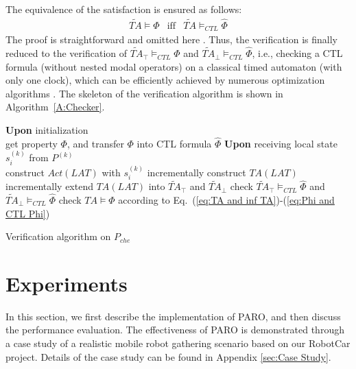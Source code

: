 \documentclass[10pt,conference,compsocconf,letterpaper]{IEEEtran}
\begin{document}
The equivalence of the satisfaction is ensured as follows:
\begin{eqnarray}\label{eq:Phi and CTL Phi}
\widetilde{TA} \models \Phi & \textrm{iff} & \widetilde{TA} \models_{CTL} \hat{\Phi}
\end{eqnarray}
The proof is straightforward and omitted here \cite{Baier08}. Thus, the verification is finally reduced to the verification of $\widetilde{TA}_\top\models_{CTL} \hat\Phi$ and $\widetilde{TA}_\bot\models_{CTL} \hat\Phi$, i.e., checking a CTL formula (without nested modal operators) on a classical timed automaton (with only one clock), which can be efficiently achieved by numerous optimization algorithms \cite{Baier08, Dill89, Laroussinie04, Wang04}. The skeleton of the verification algorithm is shown in Algorithm~\ref{A:Checker}.
\begin{algorithm}[tbp]
\SetAlgoVlined
\textbf{Upon} initialization\\
\hspace{0.4cm}get property $\Phi$, and transfer $\Phi$ into CTL formula $\hat{\Phi}$\;
\textbf{Upon} receiving local state $s^{(k)}_i$ from $P^{(k)}$\\
\hspace{0.4cm}construct $Act(LAT)$ with $s^{(k)}_i$ incrementally\;
\hspace{0.4cm}construct $TA(LAT)$ incrementally\;
\hspace{0.4cm}extend $TA(LAT)$ into $\widetilde{TA}_\top$ and $\widetilde{TA}_\bot$\;
\hspace{0.4cm}check $\widetilde{TA}_\top \models_{CTL} \hat{\Phi}$ and $\widetilde{TA}_\bot \models_{CTL} \hat{\Phi}$\;\label{line:check}
\hspace{0.4cm}check $TA \models \Phi$ according to Eq.~(\ref{eq:TA and inf TA})-(\ref{eq:Phi and CTL Phi})\;
\caption{Verification algorithm on $P_{che}$\label{A:Checker}}
\end{algorithm}

\section{Experiments} \label{sec:Performance measurements}

In this section, we first describe the implementation of \textsf{PARO}, and then discuss the performance evaluation. The effectiveness of \textsf{PARO} is demonstrated through a case study of a realistic mobile robot gathering scenario based on our RobotCar project. Details of the case study can be found in Appendix \ref{sec:Case Study}.
\end{document}
